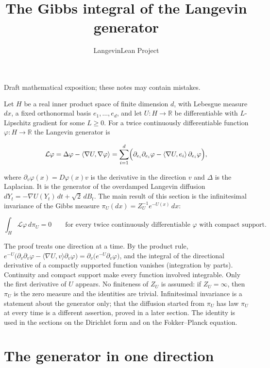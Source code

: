 \documentclass[11pt,a4paper]{article}
\title{\texorpdfstring{The Gibbs integral of the Langevin generator}{The Gibbs integral of the Langevin generator}}
\author{LangevinLean Project}
\date{}
\begin{document}
\maketitle
Draft mathematical exposition; these notes may contain mistakes.


Let \(H\) be a real inner product space of finite dimension \(d\), with Lebesgue measure \(dx\), a fixed orthonormal basis \(e_1,\dots,e_d\), and let \(U:H\to\mathbb R\) be differentiable with \(L\)-Lipschitz gradient for some \(L\ge0\). For a twice continuously differentiable function \(\varphi:H\to\mathbb R\) the Langevin generator is


\[\mathcal L\varphi=\Delta\varphi-\langle\nabla U,\nabla\varphi\rangle=\sum_{i=1}^d\Bigl(\partial_{e_i}\partial_{e_i}\varphi-\langle\nabla U,e_i\rangle\,\partial_{e_i}\varphi\Bigr),\]


where \(\partial_v\varphi(x)=D\varphi(x)v\) is the derivative in the direction \(v\) and \(\Delta\) is the Laplacian. It is the generator of the overdamped Langevin diffusion \(dY_t=-\nabla U(Y_t)\,dt+\sqrt2\,dB_t\). The main result of this section is the infinitesimal invariance of the Gibbs measure \(\pi_U(dx)=Z_U^{-1}e^{-U(x)}\,dx\):


\[\int_H\mathcal L\varphi\,d\pi_U=0\qquad\text{for every twice continuously differentiable }\varphi\text{ with compact support}.\]


The proof treats one direction at a time. By the product rule, \(e^{-U}\bigl(\partial_v\partial_v\varphi-\langle\nabla U,v\rangle\partial_v\varphi\bigr)=\partial_v\bigl(e^{-U}\partial_v\varphi\bigr)\), and the integral of the directional derivative of a compactly supported function vanishes (integration by parts). Continuity and compact support make every function involved integrable. Only the first derivative of \(U\) appears. No finiteness of \(Z_U\) is assumed: if \(Z_U=\infty\), then \(\pi_U\) is the zero measure and the identities are trivial. Infinitesimal invariance is a statement about the generator only; that the diffusion started from \(\pi_U\) has law \(\pi_U\) at every time is a different assertion, proved in a later section. The identity is used in the sections on the Dirichlet form and on the Fokker–Planck equation.


\section{\texorpdfstring{The generator in one direction}{The generator in one direction}}
\end{document}
